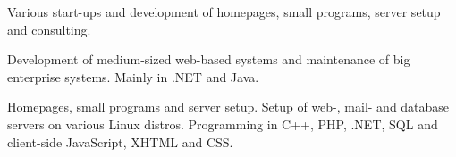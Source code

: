 \documentclass[10pt,a4paper]{altacv}
\begin{document}
\divider

Various start-ups and development of homepages, small programs, server setup and consulting.

\divider

Development of medium-sized web-based systems and maintenance of big enterprise systems. Mainly in .NET and Java.

\divider

Homepages, small programs and server setup. Setup of web-, mail- and database servers on various Linux distros. Programming in C++, PHP, .NET, SQL and client-side JavaScript, XHTML and CSS.

\clearpage

\end{document}
